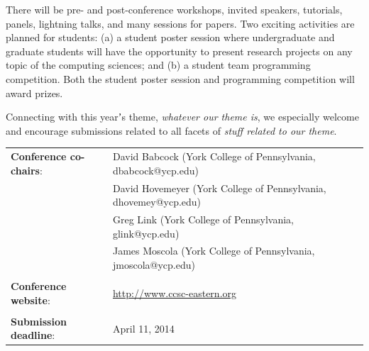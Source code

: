 \documentclass[12pt]{article}
\begin{document}
There will be pre- and post-conference workshops, invited speakers, tutorials, panels,
lightning talks, and many sessions for papers. Two exciting activities are planned
for students: (a) a student poster session where undergraduate and graduate students
will have the opportunity to present research projects on any topic of the computing
sciences; and (b) a student team programming competition.
Both the student poster session and programming competition will award prizes.

Connecting with this yearʼs theme, {\em whatever our theme is}, we especially
welcome and encourage submissions related to all facets of {\em stuff related
to our theme}.

\begin{tabular}{ll}
{\bf Conference co-chairs}: & David Babcock (York College of Pennsylvania, dbabcock@ycp.edu) \\
                            & David Hovemeyer (York College of Pennsylvania, dhovemey@ycp.edu) \\
                            & Greg Link (York College of Pennsylvania, glink@ycp.edu) \\
                            & James Moscola (York College of Pennsylvania, jmoscola@ycp.edu) \\
\\
{\bf Conference website}:   & \url{http://www.ccsc-eastern.org} \\
\\
{\bf Submission deadline}:  & April 11, 2014

\end{tabular}
\end{document}
